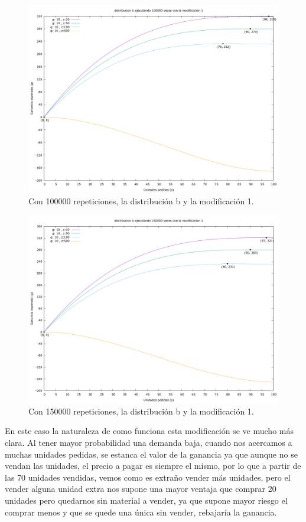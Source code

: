 \documentclass[12pt, spanish]{article}
\begin{document}
\begin{figure}[H]
	\centering
	\includegraphics[scale = 0.2]{prob_b/datos_b_100000_1.png}
	\caption{Con 100000 repeticiones, la distribución b y la modificación 1.}
	\label{fig:ej1_a_100000}

\end{figure}

\begin{figure}[H]
	\centering
	\includegraphics[scale = 0.2]{prob_b/datos_b_150000_1.png}
	\caption{Con 150000 repeticiones, la distribución b y la modificación 1.}
	\label{fig:ej1_a_150000}

\end{figure}


En este caso la naturaleza de como funciona esta modificación se ve mucho más clara. Al tener mayor probabilidad una demanda baja, cuando nos acercamos a muchas unidades pedidas, se estanca el valor de la ganancia ya que aunque no se vendan las unidades, el precio a pagar es siempre el mismo, por lo que a partir de las 70 unidades vendidas, vemos como es extraño vender más unidades, pero el vender alguna unidad extra nos supone una mayor ventaja que comprar 20 unidades pero quedarnos sin material a vender, ya que supone mayor riesgo el comprar menos y que se quede una única sin vender, rebajaría la ganancia.
\end{document}
